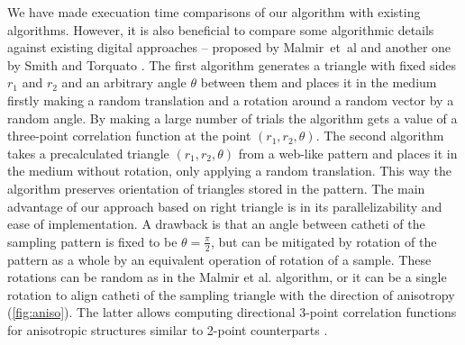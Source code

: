 \documentclass[reprint,amsmath,amssymb,aps,pre,showkeys,showpacs]{revtex4-1}
\begin{document}
We have made execuation time comparisons of our algorithm with existing
algorithms.  However, it is also beneficial to compare some algorithmic details
against existing digital approaches -- proposed by Malmir~et~al
\cite{malmir2018} and another one by Smith and Torquato \cite{SMITH1988176}. The
first algorithm generates a triangle with fixed sides $r_1$ and $r_2$ and an
arbitrary angle $\theta$ between them and places it in the medium firstly making
a random translation and a rotation around a random vector by a random angle. By
making a large number of trials the algorithm gets a value of a three-point
correlation function at the point $(r_1, r_2, \theta)$. The second algorithm
takes a precalculated triangle $(r_1, r_2, \theta)$ from a web-like pattern and
places it in the medium without rotation, only applying a random
translation. This way the algorithm preserves orientation of triangles stored in
the pattern. The main advantage of our approach based on right triangle is in
its parallelizability and ease of implementation. A drawback is that an angle
between catheti of the sampling pattern is fixed to be $\theta = \frac{\pi}{2}$,
but can be mitigated by rotation of the pattern as a whole by an equivalent
operation of rotation of a sample. These rotations can be random as in the
Malmir et al. algorithm, or it can be a single rotation to align catheti of the
sampling triangle with the direction of anisotropy (\cref{fig:aniso}). The
latter allows computing directional 3-point correlation functions for
anisotropic structures similar to 2-point counterparts
\cite{10.1063/1.4867611,EPL1}.
\end{document}
